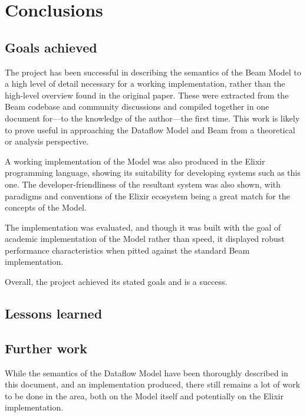 \chapter{Conclusions}
\section{Goals achieved}

The project has been successful in describing the semantics of the Beam Model to a high level of detail necessary for a working implementation, rather than the high-level overview found in the original paper.
These were extracted from the Beam codebase and community discussions and compiled together in one document for---to the knowledge of the author---the first time.
This work is likely to prove useful in approaching the Dataflow Model and Beam from a theoretical or analysis perspective.

A working implementation of the Model was also produced in the Elixir programming language, showing its suitability for developing systems such as this one.
The developer-friendliness of the resultant system was also shown, with paradigms and conventions of the Elixir ecosystem being a great match for the concepts of the Model.

The implementation was evaluated, and though it was built with the goal of academic implementation of the Model rather than speed, it displayed robust performance characteristics when pitted against the standard Beam implementation.

Overall, the project achieved its stated goals and is a success.

\section{Lessons learned}
\section{Further work}

While the semantics of the Dataflow Model have been thoroughly described in this document, and an implementation produced, there still remains a lot of work to be done in the area, both on the Model itself and potentially on the Elixir implementation.

